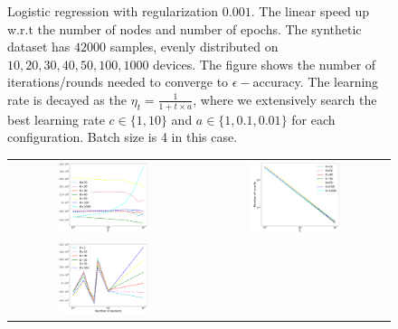 \begin{figure}
\begin{tabular}{cc}
\end{tabular}
	\caption{Logistic regression with regularization $0.001$. The linear speed up w.r.t the number of nodes and number of epochs. The synthetic dataset has $42000$ samples, evenly distributed on $10, 20, 30, 40, 50, 100, 1000$ devices. The figure shows the number of iterations/rounds needed to converge to $\epsilon-$accuracy. The learning rate is decayed as the $\eta_t = \frac{1}{1 + t \times a}$, where we extensively search the best learning rate $c \in \{1, 10\}$ and $a \in \{1, 0.1, 0.01\}$ for each configuration. Batch size is 4 in this case.}
\end{figure}



\begin{figure}
\centering
\begin{tabular}{cc}
	\includegraphics[width=0.5\textwidth]{fig/speedupEpochsT-synthetic_logistic_regression_iclr300-epsilon07-b4-reg0-adapt0.pdf} & 
\includegraphics[width=0.5\textwidth]{fig/speedupEpochsRounds-synthetic_logistic_regression_iclr300-epsilon07-b4-reg0-adapt0.pdf} \\
	\includegraphics[width=0.5\textwidth]{fig/speedupNodesT-synthetic_logistic_regression_iclr300-epsilon07-b4-reg0-adapt0.pdf} & 

\end{tabular}
\end{figure}
